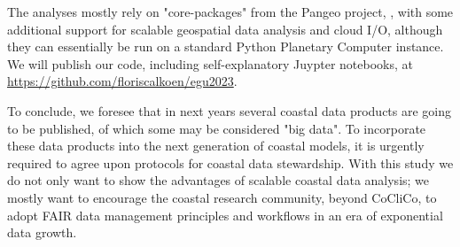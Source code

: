 \documentclass[11pt,twoside,a4paper]{article}
\begin{document}
{  The analyses mostly rely on "core-packages" from the Pangeo project,
  \parencite{hammanPangeoBigdataEcosystem2018}, with some additional support for
  scalable geospatial data analysis and cloud I/O, although they can essentially be run
  on a standard Python Planetary Computer instance. We will publish our code, including
  self-explanatory Juypter notebooks, at \url{https://github.com/floriscalkoen/egu2023}.

  To conclude, we foresee that in next years several coastal data products are going to
  be published, of which some may be considered "big data". To incorporate these data
  products into the next generation of coastal models, it is urgently required to agree
  upon protocols for coastal data stewardship. With this study we do not only want to
  show the advantages of scalable coastal data analysis; we mostly want to encourage the
  coastal research community, beyond CoCliCo, to adopt FAIR data management principles
  \parencite{wilkinsonFAIRGuidingPrinciples2016} and workflows in an era of exponential
  data growth.}

\printbibliography
\end{document}
